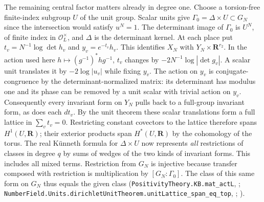 The remaining central factor matters already in degree one. Choose a
torsion-free finite-index subgroup $U$ of the unit group. Scalar units
give $\Gamma_0=\Delta\times U\subset G_N$ since the intersection would
satisfy $u^N=1$. The determinant image of $\Gamma_0$ is $U^N$, of finite
index in $\mathcal O_L^\times$, and $\Delta$ is the determinant kernel.
At each place put $t_v=N^{-1}\log\det h_v$ and
$y_v=e^{-t_v}h_v$. This identifies $X_N$ with
$Y_N\times\mathbf R^{r_2}$. In the action used here
$h\mapsto(g^{-1})^*hg^{-1}$, $t_v$ changes by
$-2N^{-1}\log|\det g_v|$. A scalar unit translates it by
$-2\log|u_v|$ while fixing $y_v$. The action on $y_v$ is
conjugate-congruence by the determinant-normalized matrix: its determinant
has modulus one and its phase can be removed by a unit scalar with
trivial action on $y_v$. Consequently every invariant form on $Y_N$
pulls back to a full-group invariant form, as does each $dt_v$.
By the unit theorem these scalar translations form a full lattice in
$\sum_v t_v=0$. Restricting constant covectors to the lattice therefore
spans $H^1(U,\mathbf R)$; their exterior products span $H^*(U,\mathbf R)$
by the cohomology of the torus. The real K\"unneth formula for
$\Delta\times U$ now represents \emph{all} restrictions of classes in
degree $q$ by sums of wedges of the two kinds of invariant forms. This
includes all mixed terms. Restriction from $G_N$ is injective because
transfer composed with restriction is multiplication by $[G_N:\Gamma_0]$.
The class of this same form on $G_N$ thus equals the given class
(\nolinkurl{PositivityTheory.KB.mat_actL}, ;
\nolinkurl{NumberField.Units.dirichletUnitTheorem.unitLattice_span_eq_top},
;
\cite[Theorem 5.1 and its proof]{P-Milne-Mink}).

